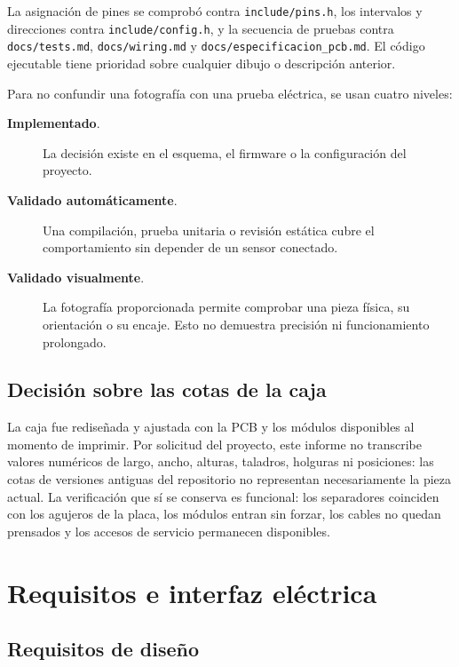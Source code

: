 \documentclass[11pt,a4paper,oneside]{report}
\newcommand{\codigo}[1]{\texttt{\small #1}}
\newcommand{\implementado}{\textcolor{verde}{\textbf{Implementado}}}
\newcommand{\visual}{\textcolor{verde}{\textbf{Validado visualmente}}}
\newcommand{\automatico}{\textcolor{azulproyecto}{\textbf{Validado automáticamente}}}
\begin{document}
La asignación de pines se comprobó contra \codigo{include/pins.h}, los intervalos y
direcciones contra \codigo{include/config.h}, y la secuencia de pruebas contra
\codigo{docs/tests.md}, \codigo{docs/wiring.md} y
\codigo{docs/especificacion\_pcb.md}.
El código ejecutable tiene prioridad sobre cualquier dibujo o descripción anterior.

Para no confundir una fotografía con una prueba eléctrica, se usan cuatro niveles:

\begin{description}
  \item[\implementado.] La decisión existe en el esquema, el firmware o la
        configuración del proyecto.
  \item[\automatico.] Una compilación, prueba unitaria o revisión estática cubre
        el comportamiento sin depender de un sensor conectado.
  \item[\visual.] La fotografía proporcionada permite comprobar una pieza física,
        su orientación o su encaje. Esto no demuestra precisión ni funcionamiento
        prolongado.
\end{description}

\section{Decisión sobre las cotas de la caja}

La caja fue rediseñada y ajustada con la PCB y los módulos disponibles al momento
de imprimir. Por solicitud del proyecto, este informe no transcribe valores
numéricos de largo, ancho, alturas, taladros, holguras ni posiciones: las cotas de
versiones antiguas del repositorio no representan necesariamente la pieza actual.
La verificación que sí se conserva es funcional: los separadores coinciden con los
agujeros de la placa, los módulos entran sin forzar, los cables no quedan prensados
y los accesos de servicio permanecen disponibles.

\chapter{Requisitos e interfaz eléctrica}

\section{Requisitos de diseño}
\end{document}
